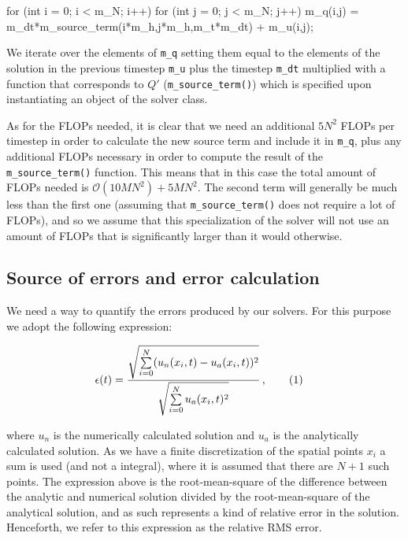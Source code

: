 \documentclass[reprint,english,notitlepage]{revtex4-1}  %
\newcommand\numberthis{\addtocounter{equation}{1}\tag{\theequation}}
\begin{document}
\begin{cpp}
for (int i = 0; i < m_N; i++){
  for (int j = 0; j < m_N; j++){
    m_q(i,j) = m_dt*m_source_term(i*m_h,j*m_h,m_t*m_dt) + m_u(i,j);
  }
}
\end{cpp}

We iterate over the elements of \verb+m_q+ setting them equal to the elements of the solution in the previous timestep \verb+m_u+ plus the timestep \verb+m_dt+ multiplied with a function that corresponds to $Q'$ (\verb+m_source_term()+) which is specified upon instantiating an object of the solver class.

As for the FLOPs needed, it is clear that we need an additional $5N^2$ FLOPs per timestep in order to calculate the new source term and include it in \verb+m_q+, plus any additional FLOPs necessary in order to compute the result of the \verb+m_source_term()+ function. This means that in this case the total amount of FLOPs needed is $\mathcal{O}(10MN^2) + 5MN^2$. The second term will generally be much less than the first one (assuming that \verb+m_source_term()+ does not require a lot of FLOPs), and so we assume that this specialization of the solver will not use an amount of FLOPs that is significantly larger than it would otherwise.


\subsection{Source of errors and error calculation} \label{sec:method_errors}

We need a way to quantify the errors produced by our solvers. For this purpose we adopt the following expression:

\begin{align*}
\epsilon (t) &= \frac{\sqrt{\sum\limits_{i=0}^N (u_n(x_i,t) - u_a(x_i,t))^2}}{\sqrt{\sum\limits_{i=0}^N u_a(x_i,t)^2}} \, , \numberthis \label{eq:error_1D}
\end{align*}

where $u_n$ is the numerically calculated solution and $u_a$ is the analytically calculated solution. As we have a finite discretization of the spatial points $x_i$ a sum is used (and not a integral), where it is assumed that there are $N+1$ such points. The expression above is the root-mean-square of the difference between the analytic and numerical solution divided by the root-mean-square of the analytical solution, and as such represents a kind of relative error in the solution. Henceforth, we refer to this expression as the relative RMS error.
\end{document}
